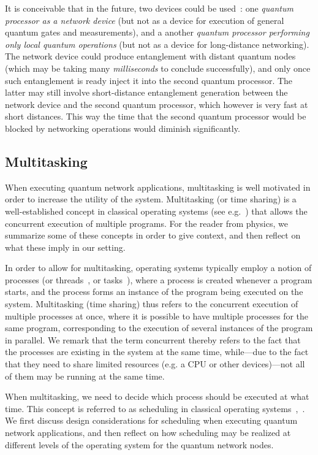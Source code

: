 It is conceivable that in the future, two devices could be used~\cite{vardoyan_2022_netarch}: one \emph{quantum processor as a network device} (but not as a device for execution of general quantum gates and measurements), and a another \emph{quantum processor performing only local quantum operations} (but not as a device for long-distance networking). The network device could produce entanglement with distant quantum nodes (which may be taking many \emph{milliseconds} to conclude successfully), and only once such entanglement is ready inject it into the second quantum processor. The latter may still involve short-distance entanglement generation between the network device and the second quantum processor, which however is very fast at short distances. This way the time that the second quantum processor would be blocked by networking operations would diminish significantly.

\subsection{Multitasking}

When executing quantum network applications, multitasking is well motivated in order to increase the utility of the system. Multitasking (or time sharing) is a well-established concept in classical operating systems (see e.g.~\cite[Section 1.4]{silberschatz_book_2014}) that allows the concurrent execution of multiple programs. For the reader from physics, we summarize some of these concepts in order to give context, and then reflect on what these imply in our setting.

In order to allow for multitasking, operating systems typically employ a notion of processes (or threads~\cite[Chapter 4]{silberschatz_book_2014}, or tasks~\cite[Section 3.1]{silberschatz_book_2014}), where a process is created whenever a program starts, and the process forms an instance of the program being executed on the system. Multitasking (time sharing) thus refers to the concurrent execution of multiple processes at once, where it is possible to have multiple processes for the same program, corresponding to the execution of several instances of the program in parallel. We remark that the term concurrent thereby refers to the fact that the processes are existing in the system at the same time, while---due to the fact that they need to share limited resources (e.g. a \ac{CPU} or other devices)---not all of them may be running at the same time.


When multitasking, we need to decide which process should be executed at what time. This concept is referred to as  scheduling in classical operating systems~\cite[Section 2.4]{tanenbaum_operating_2005},~\cite[Section 3.2]{silberschatz_book_2014}. We first discuss design considerations for scheduling when executing quantum network applications, and then reflect on how scheduling may be realized at different levels of the operating system for the quantum network nodes. 

